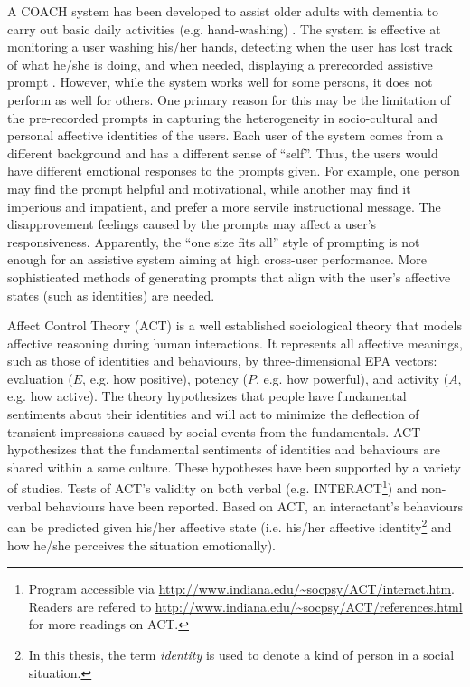 A COACH system has been developed to assist older adults with dementia to carry out basic daily activities (e.g. hand-washing) \cite{boger2005decision, mihailidis2008coach}. The system is effective at monitoring a user washing his/her hands, detecting when the user has lost track of what he/she is doing, and when needed, displaying a prerecorded assistive prompt \cite{mihailidis2008coach}. However, while the system works well for some persons, it does not perform as well for others. One primary reason for this may be the limitation of the pre-recorded prompts in capturing the heterogeneity in socio-cultural and personal affective identities of the users. Each user of the system comes from a different background and has a different sense of ``self''. Thus, the users would have different emotional responses to the prompts given. For example, one person may find the prompt helpful and motivational, while another may find it imperious and impatient, and prefer a more servile instructional message. The disapprovement feelings caused by the prompts may affect a user's responsiveness. Apparently, the ``one size fits all'' style of prompting is not enough for an assistive system aiming at high cross-user performance. More sophisticated methods of generating prompts that align with the user's affective states (such as identities) are needed.

Affect Control Theory (ACT) \cite{robinson2006affect} is a well established sociological theory that models affective reasoning during human interactions. It represents all affective meanings, such as those of identities and behaviours, by three-dimensional EPA vectors: evaluation ($E$, e.g. how positive), potency ($P$, e.g. how powerful), and activity ($A$, e.g. how active). The theory hypothesizes that people have fundamental sentiments about their identities and will act to minimize the deflection of transient impressions caused by social events from the fundamentals. ACT hypothesizes that the fundamental sentiments of identities and behaviours are shared within a same culture. These hypotheses have been supported by a variety of studies. Tests of ACT's validity on both verbal (e.g. INTERACT\footnote{Program accessible via \url{http://www.indiana.edu/~socpsy/ACT/interact.htm}. Readers are refered to \url{http://www.indiana.edu/~socpsy/ACT/references.html} for more readings on ACT.}) and non-verbal behaviours \cite{schroder2013culture} have been reported. Based on ACT, an interactant's behaviours can be predicted given his/her affective state (i.e. his/her affective identity\footnote{In this thesis, the term \textit{identity} is used to denote a kind of person in a social situation.} and how he/she perceives the situation emotionally).


